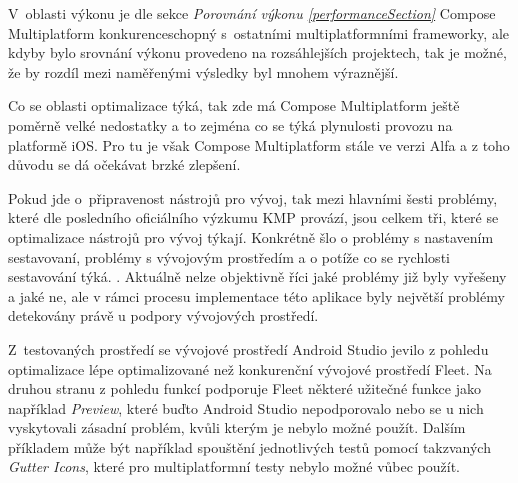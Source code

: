 V~oblasti výkonu je dle sekce \textit{Porovnání výkonu \ref{performanceSection}} Compose Multiplatform konkurenceschopný s~ostatními 
multiplatformními frameworky, ale kdyby bylo srovnání výkonu provedeno na rozsáhlejších projektech, tak je možné, že by rozdíl mezi 
naměřenými výsledky byl mnohem výraznější.

Co se oblasti optimalizace týká, tak zde má Compose Multiplatform ještě poměrně velké nedostatky a to zejména co se týká plynulosti
provozu na platformě iOS. Pro tu je však Compose Multiplatform stále ve verzi Alfa a z toho důvodu se dá očekávat brzké zlepšení.

Pokud jde o~připravenost nástrojů pro vývoj, tak mezi hlavními šesti problémy, které dle posledního oficiálního výzkumu KMP
provází, jsou celkem tři, které se optimalizace nástrojů pro vývoj týkají. Konkrétně šlo o problémy s nastavením sestavovaní, problémy s 
vývojovým prostředím a o potíže co se rychlosti sestavování týká. \cite{imgSurvey}. Aktuálně nelze objektivně říci jaké problémy již byly 
vyřešeny a jaké ne, ale v rámci procesu implementace této aplikace byly největší problémy detekovány právě u podpory vývojových prostředí.

Z~testovaných prostředí se vývojové prostředí Android Studio jevilo z pohledu optimalizace lépe optimalizované než konkurenční vývojové 
prostředí Fleet. Na druhou stranu z pohledu funkcí podporuje Fleet některé užitečné funkce jako například \textit{Preview}, které buďto
Android Studio nepodporovalo nebo se u nich vyskytovali zásadní problém, kvůli kterým je nebylo možné použít. Dalším příkladem může být 
například spouštění jednotlivých testů pomocí takzvaných \textit{Gutter Icons}, které pro multiplatformní testy nebylo možné vůbec použít. 




